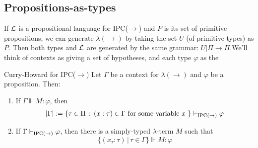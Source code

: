 \documentclass{article}
\numberwithin{thm}{subsection}
\begin{document}
\subsection{Propositions-as-types}
If $\mathcal{L}$ is a propositional language for IPC($\to$) and $P$ is its set of primitive propositions, we can generate $\lambda(\to)$ by taking the set $U$ (of primitive types) as $P$. \gap Then both types and $\mathcal{L}$ are generated by the same grammar: $U | \Pi \to \Pi$.\gap We'll think of contexts as giving a set of hypotheses, and each type $\varphi$ as the 
\begin{fancyprop}{Curry-Howard for IPC($\to$)}
    Let $\Gamma$ be a context for $\lambda(\to)$ and $\varphi$ be a proposition. Then: 
    \begin{enumerate}
        \item If $\Gamma \Vdash M : \varphi$, then \[|\Gamma| := \{ \tau \in \Pi \, : \, (x : \tau) \in \Gamma \text{ for some variable $x$ } \} \vdash_{\text{IPC$(\to)$}} \varphi\]
        \item If $\Gamma \vdash_{\text{IPC$(\to)$}} \varphi$, then there is a simply-typed $\lambda$-term $M$ such that \[\{(x_{\tau} : \tau) \, | \, \tau \in \Gamma \} \Vdash M : \varphi\]
    \end{enumerate}
\end{fancyprop}
\proof \hspace{0.1cm}
\end{document}
